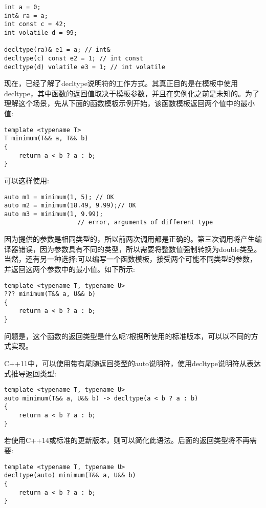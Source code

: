 \begin{lstlisting}[style=styleCXX]
int a = 0;
int& ra = a;
int const c = 42;
int volatile d = 99;

decltype(ra)& e1 = a; // int&
decltype(c) const e2 = 1; // int const
decltype(d) volatile e3 = 1; // int volatile
\end{lstlisting}

现在，已经了解了decltype说明符的工作方式。其真正目的是在模板中使用decltype，其中函数的返回值取决于模板参数，并且在实例化之前是未知的。为了理解这个场景，先从下面的函数模板示例开始，该函数模板返回两个值中的最小值:

\begin{lstlisting}[style=styleCXX]
template <typename T>
T minimum(T&& a, T&& b)
{
	return a < b ? a : b;
}
\end{lstlisting}

可以这样使用:

\begin{lstlisting}[style=styleCXX]
auto m1 = minimum(1, 5); // OK
auto m2 = minimum(18.49, 9.99);// OK
auto m3 = minimum(1, 9.99);
                    // error, arguments of different type
\end{lstlisting}

因为提供的参数是相同类型的，所以前两次调用都是正确的。第三次调用将产生编译器错误，因为参数具有不同的类型，所以需要将整数值强制转换为double类型。当然，还有另一种选择:可以编写一个函数模板，接受两个可能不同类型的参数，并返回这两个参数中的最小值。如下所示:

\begin{lstlisting}[style=styleCXX]
template <typename T, typename U>
??? minimum(T&& a, U&& b)
{
	return a < b ? a : b;
}
\end{lstlisting}

问题是，这个函数的返回类型是什么呢?根据所使用的标准版本，可以以不同的方式实现。

C++11中，可以使用带有尾随返回类型的auto说明符，使用decltype说明符从表达式推导返回类型:

\begin{lstlisting}[style=styleCXX]
template <typename T, typename U>
auto minimum(T&& a, U&& b) -> decltype(a < b ? a : b)
{
	return a < b ? a : b;
}
\end{lstlisting}

若使用C++14或标准的更新版本，则可以简化此语法。后面的返回类型将不再需要:

\begin{lstlisting}[style=styleCXX]
template <typename T, typename U>
decltype(auto) minimum(T&& a, U&& b)
{
	return a < b ? a : b;
}
\end{lstlisting}

